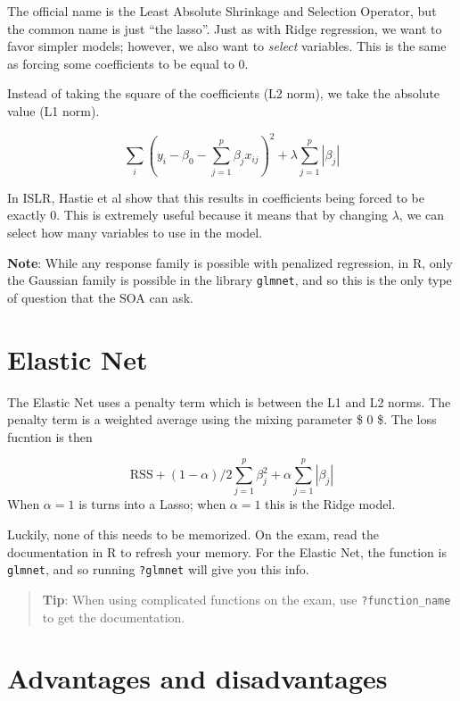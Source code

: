 \documentclass[]{book}
\begin{document}
The official name is the Least Absolute Shrinkage and Selection Operator, but the common name is just ``the lasso''. Just as with Ridge regression, we want to favor simpler models; however, we also want to \emph{select} variables. This is the same as forcing some coefficients to be equal to 0.

Instead of taking the square of the coefficients (L2 norm), we take the absolute value (L1 norm).

\[
\sum_i(y_i - \beta_0 - \sum_{j = 1}^p\beta_j x_{ij})^2 + \lambda \sum_{j = 1}^p|\beta_j|
\]

In ISLR, Hastie et al show that this results in coefficients being forced to be exactly 0. This is extremely useful because it means that by changing \(\lambda\), we can select how many variables to use in the model.

\textbf{Note}: While any response family is possible with penalized regression, in R, only the Gaussian family is possible in the library \texttt{glmnet}, and so this is the only type of question that the SOA can ask.

\hypertarget{elastic-net}{%
\section{Elastic Net}\label{elastic-net}}

The Elastic Net uses a penalty term which is between the L1 and L2 norms. The penalty term is a weighted average using the mixing parameter \$ 0 \leq \alpha {}\$. The loss fucntion is then

\[\text{RSS} + (1 - \alpha)/2 \sum_{j = 1}^{p}\beta_j^2 + \alpha \sum_{j = 1}^p |\beta_j|\]
When \(\alpha = 1\) is turns into a Lasso; when \(\alpha = 1\) this is the Ridge model.

Luckily, none of this needs to be memorized. On the exam, read the documentation in R to refresh your memory. For the Elastic Net, the function is \texttt{glmnet}, and so running \texttt{?glmnet} will give you this info.

\begin{quote}
\textbf{Tip}: When using complicated functions on the exam, use \texttt{?function\_name} to get the documentation.
\end{quote}

\hypertarget{advantages-and-disadvantages-1}{%
\section{Advantages and disadvantages}\label{advantages-and-disadvantages-1}}
\end{document}
